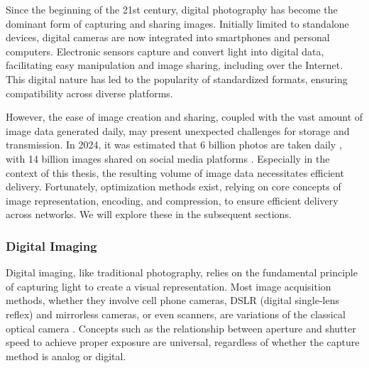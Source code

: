 
Since the beginning of the 21st century, digital photography has become the dominant form \cite{zdnet2003more-digital-cameras} of capturing and sharing images. Initially limited to standalone devices, digital cameras are now integrated into smartphones and personal computers. Electronic sensors capture and convert light into digital data, facilitating easy manipulation and image sharing, including over the Internet. This digital nature has led to the popularity of standardized formats, ensuring compatibility across diverse platforms.

However, the ease of image creation and sharing, coupled with the vast amount of image data generated daily, may present unexpected challenges for storage and transmission. In 2024, it was estimated that 6 billion photos are taken daily \cite{broz2024photo-statistics}, with 14 billion images shared on social media platforms \cite{richter2017smartphones-cause-photography-boom}. Especially in the context of this thesis, the resulting volume of image data necessitates efficient delivery. Fortunately, optimization methods exist, relying on core concepts of image representation, encoding, and compression, to ensure efficient delivery across networks. We will explore these in the subsequent sections.

\subsubsection{Digital Imaging}
\label{sec:digital-imaging}


Digital imaging, like traditional photography, relies on the fundamental principle of capturing light to create a visual representation. Most image acquisition methods, whether they involve cell phone cameras, DSLR (digital single-lens reflex) and mirrorless cameras, or even scanners, are variations of the classical optical camera \cite{white2005digital-photography}. Concepts such as the relationship between aperture and shutter speed to achieve proper exposure are universal, regardless of whether the capture method is analog or digital.

